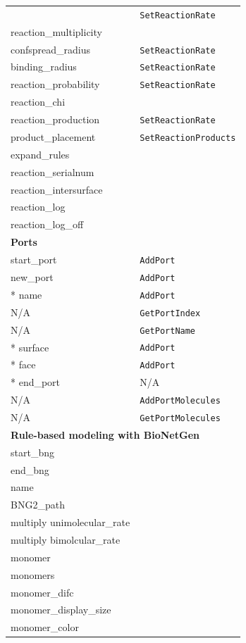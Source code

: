 \documentclass {scrbook}
\newcommand {\ttt} {\texttt}
\begin{document}
\begin{longtable}[c]{ll}
& \ttt{SetReactionRate}\\
reaction\_multiplicity \\ %
confspread\_radius & \ttt{SetReactionRate}\\
binding\_radius & \ttt{SetReactionRate}\\
reaction\_probability & \ttt{SetReactionRate}\\
reaction\_chi \\ %
reaction\_production & \ttt{SetReactionRate}\\
product\_placement & \ttt{SetReactionProducts}\\
expand\_rules \\ %
reaction\_serialnum \\ %
reaction\_intersurface \\ %
reaction\_log \\ %
reaction\_log\_off \\ %
\hline
\multicolumn{2}{l}{\hspace{0.3in}\textbf{Ports}}\\
\hline
start\_port & \ttt{AddPort}\\
new\_port & \ttt{AddPort}\\
{*} name & \ttt{AddPort}\\
N/A & \ttt{GetPortIndex}\\
N/A & \ttt{GetPortName}\\
{*} surface & \ttt{AddPort}\\
{*} face & \ttt{AddPort}\\
{*} end\_port & N/A\\
N/A & \ttt{AddPortMolecules}\\
N/A & \ttt{GetPortMolecules}\\
\hline
\multicolumn{2}{l}{\hspace{0.3in}\textbf{Rule-based modeling with BioNetGen}}\\
\hline
start\_bng \\ %
end\_bng \\ %
name \\ %
BNG2\_path \\ %
multiply unimolecular\_rate \\ %
multiply bimolcular\_rate \\ %
monomer \\ %
monomers \\ %
monomer\_difc \\ %
monomer\_display\_size \\ %
monomer\_color \\ %

\end{longtable}
\end{document}
